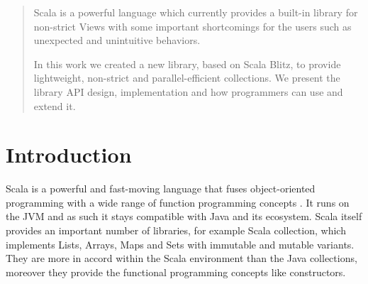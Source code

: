 \documentclass[a4paper,12pt,twocolumn]{article}
\begin{document}
\begin{abstract}
Scala is a powerful language which currently provides a built-in library for non-strict Views with some important shortcomings for the users such as unexpected and unintuitive behaviors.

In this work we created a new library, based on Scala Blitz, to provide lightweight, non-strict and parallel-efficient collections.
We present the library API design, implementation and how programmers can use and extend it.
\end{abstract}

\section{Introduction}
Scala is a powerful and fast-moving language that fuses object-oriented programming with a wide range of function programming concepts \cite{scala-overview}.
It runs on the JVM and as such it stays compatible with Java and its ecosystem.
Scala itself provides an important number of libraries, for example Scala collection, which implements Lists, Arrays, Maps and Sets with immutable and mutable variants.
They are more in accord within the Scala environment than the Java collections, moreover they provide the functional programming concepts like constructors.
\end{document}
